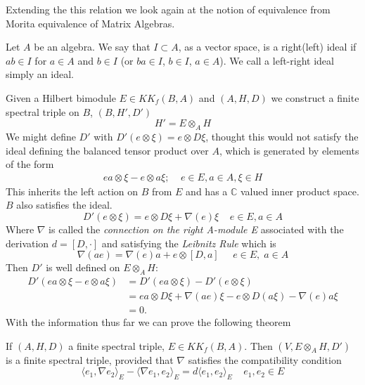 Extending the this relation we look again at  the notion of equivalence from
Morita equivalence of Matrix Algebras.
\newline

\begin{definition}
    Let $A$ be an algebra. We say that $I \subset A$, as a vector space, is a
    right(left) ideal if $ab \in I$ for $a \in A$ and $b\in I$ (or $ba \in
    I$, $b\in I$, $a\in A$). We call a left-right ideal simply an ideal.
\end{definition}

Given a Hilbert bimodule $E \in KK_f(B, A)$ and $(A, H, D)$ we construct
a finite spectral triple on $B$, $(B, H', D')$
\begin{equation}
    H' = E \otimes _A H
\end{equation}
We might define $D'$ with $D'(e \otimes \xi) = e\otimes D\xi$, thought this
would not satisfy the ideal defining the balanced tensor product over $A$,
which is generated by elements of the form
\begin{align}
    e a \otimes \xi - e\otimes a \xi ;\;\;\;\; e\in E, a\in A, \xi \in H
\end{align}
This inherits the left action on $B$ from $E$ and has a $\mathbb{C}$
valued inner product space. $B$ also satisfies the ideal.
\begin{equation}
    D'(e\otimes \xi) = e \otimes D \xi + \nabla (e) \xi \;\;\;\; e\in
    E, a\in A
\end{equation}
Where $\nabla$ is called the \textit{connection on the right A-module E}
associated with the  derivation $d=[D, \cdot]$ and satisfying the
\textit{Leibnitz Rule} which is
\begin{equation}
    \nabla(ae) = \nabla(e)a + e \otimes [D, a] \;\;\;\;\;  e\in E,\; a\in A
\end{equation}
Then $D'$ is well defined on $E \otimes _A H$:
\begin{align}
    D'(ea \otimes \xi - e \otimes a \xi) &=  D'(ea \otimes \xi) - D'(e
    \otimes \xi) \\
    &= ea\otimes D\xi + \nabla(ae) \xi - e \otimes D(a\xi ) - \nabla (e)a
    \xi \\
    &= 0.
\end{align}
With the information thus far we can prove the following theorem
\begin{theorem}
    If $(A, H, D)$ a finite spectral triple, $E \in KK_f(B, A)$.
    Then $(V, E\otimes _A H, D')$ is a finite spectral triple, provided that
    $\nabla$ satisfies the compatibility condition
    \begin{equation}
        \langle e_1, \nabla e_2 \rangle _E - \langle \nabla e_1, e_2
        \rangle _E = d\langle e_1, e_2 \rangle _E \;\;\;\; e_1, e_2 \in E
    \end{equation}
\end{theorem}

